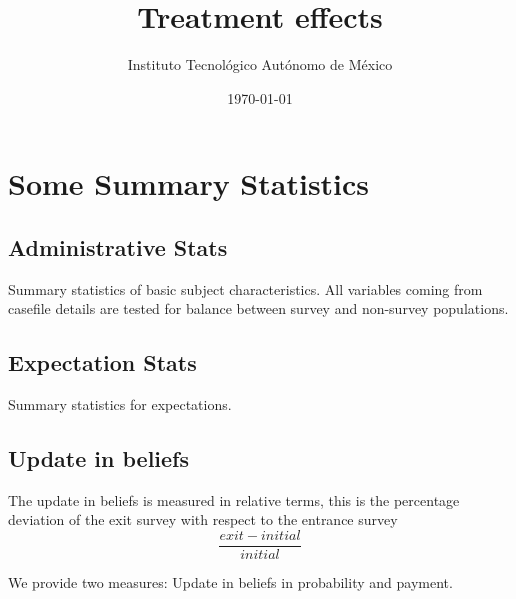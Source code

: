 \documentclass[12pt]{article}
\theoremstyle{named}
\newcommand{\folder}{./Effect}
\begin{document}
\title{Treatment effects}

\author{Instituto Tecnológico Autónomo de México}
\date{\today}
\maketitle


\hrulefill


\section{\Huge{Some Summary Statistics}}

\vspace{7mm}

\subsection*{Administrative Stats}

Summary statistics of basic subject characteristics. All variables coming from casefile details are tested for balance between survey and non-survey populations.

\begin{center}
\scriptsize{}
\end{center}

\pagebreak

\subsection*{Expectation Stats}

Summary statistics for expectations.

\begin{center}
\scriptsize{}
\end{center}

\pagebreak

\subsection*{Update in beliefs}

The update in beliefs is measured in relative terms, this is the percentage deviation of the exit survey with respect to the entrance survey
\[\frac{exit-initial}{initial}\]

We provide two measures: Update in beliefs in probability and payment.\\

\begin{center}
\scriptsize{}
\end{center}
\end{document}
